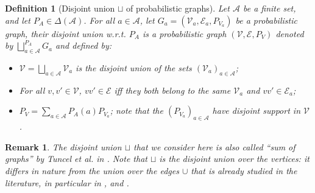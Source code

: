 \documentclass[conference,a4paper]{IEEEtran}
\newtheorem{definition}[theorem]{Definition}
\newtheorem{remark}[theorem]{Remark}
\def\ar#1{\textcolor{red}{\footnotesize {(ar: #1)}}}
\begin{document}
\begin{definition}[Disjoint union $\sqcup$ of probabilistic graphs] \label{def:disjointunion}
Let $\mathcal{A}$ be a finite set, and let $P_A \in \Delta(\mathcal{A})$. For all $a \in \mathcal{A}$, let $G_a = (\mathcal{V}_a, \mathcal{E}_a, P_{V_a})$ be a probabilistic graph, their disjoint union w.r.t. $P_A$ is a probabilistic graph $(\mathcal{V}, \mathcal{E}, P_V)$ denoted by $\bigsqcup^{P_A}_{a \in \mathcal{A}} G_a$ and defined by:
\begin{itemize}[label = - ]
    \item $\mathcal{V} = \bigsqcup_{a \in \mathcal{A}} \mathcal{V}_a$ is the disjoint union of the sets $(\mathcal{V}_a)_{a \in \mathcal{A}}$;
    \item For all $v,v' \in \mathcal{V}$, $vv' \in \mathcal{E}$ iff they both belong to the same $\mathcal{V}_a$ and $vv' \in \mathcal{E}_a$;
    \item $P_V = \sum_{a \in \mathcal{A}} P_A(a) P_{V_a}$; note that the $(P_{V_a})_{a \in \mathcal{A}}$ have disjoint support in $\mathcal{V}$.
\end{itemize}
\end{definition}

\begin{remark}
    The disjoint union $\sqcup$ that we consider here is also called ``sum of graphs'' by Tuncel et al. in \cite{tuncel2009complementary}. Note that $\sqcup$ is the disjoint union over the vertices: it differs in nature from the union over the edges $\cup$ that is already studied in the literature, in particular in \cite{korner1988graphs}, \cite{csiszar1990entropy} and \cite{marton1993shannon}. %
\end{remark}
\end{document}
